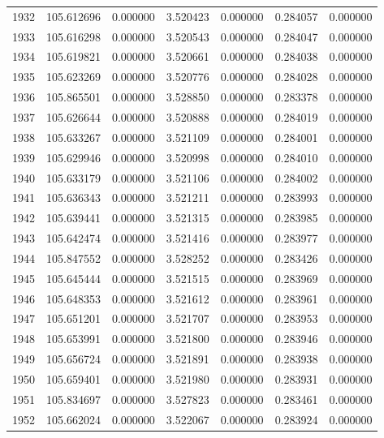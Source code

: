 \begin{tabular}{rrrrrrr}
1932 & 105.612696 &    0.000000 &  3.520423 &   0.000000 &   0.284057 &  0.000000 \\
1933 & 105.616298 &    0.000000 &  3.520543 &   0.000000 &   0.284047 &  0.000000 \\
1934 & 105.619821 &    0.000000 &  3.520661 &   0.000000 &   0.284038 &  0.000000 \\
1935 & 105.623269 &    0.000000 &  3.520776 &   0.000000 &   0.284028 &  0.000000 \\
1936 & 105.865501 &    0.000000 &  3.528850 &   0.000000 &   0.283378 &  0.000000 \\
1937 & 105.626644 &    0.000000 &  3.520888 &   0.000000 &   0.284019 &  0.000000 \\
1938 & 105.633267 &    0.000000 &  3.521109 &   0.000000 &   0.284001 &  0.000000 \\
1939 & 105.629946 &    0.000000 &  3.520998 &   0.000000 &   0.284010 &  0.000000 \\
1940 & 105.633179 &    0.000000 &  3.521106 &   0.000000 &   0.284002 &  0.000000 \\
1941 & 105.636343 &    0.000000 &  3.521211 &   0.000000 &   0.283993 &  0.000000 \\
1942 & 105.639441 &    0.000000 &  3.521315 &   0.000000 &   0.283985 &  0.000000 \\
1943 & 105.642474 &    0.000000 &  3.521416 &   0.000000 &   0.283977 &  0.000000 \\
1944 & 105.847552 &    0.000000 &  3.528252 &   0.000000 &   0.283426 &  0.000000 \\
1945 & 105.645444 &    0.000000 &  3.521515 &   0.000000 &   0.283969 &  0.000000 \\
1946 & 105.648353 &    0.000000 &  3.521612 &   0.000000 &   0.283961 &  0.000000 \\
1947 & 105.651201 &    0.000000 &  3.521707 &   0.000000 &   0.283953 &  0.000000 \\
1948 & 105.653991 &    0.000000 &  3.521800 &   0.000000 &   0.283946 &  0.000000 \\
1949 & 105.656724 &    0.000000 &  3.521891 &   0.000000 &   0.283938 &  0.000000 \\
1950 & 105.659401 &    0.000000 &  3.521980 &   0.000000 &   0.283931 &  0.000000 \\
1951 & 105.834697 &    0.000000 &  3.527823 &   0.000000 &   0.283461 &  0.000000 \\
1952 & 105.662024 &    0.000000 &  3.522067 &   0.000000 &   0.283924 &  0.000000 \\

\end{tabular}
